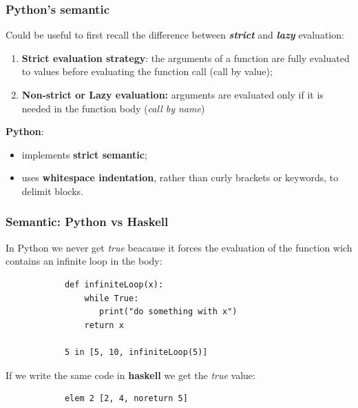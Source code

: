 \documentclass[xcolor ={table,usenames,dvipsnames}]{beamer}
\theoremstyle{definition}
\begin{document}
	\begin{frame}
		\frametitle{Python's semantic}
			Could be useful to first recall the difference between \textit{\textbf{strict}} and \textit{\textbf{lazy}} evaluation:
			\begin{enumerate}
				\item \textbf{Strict evaluation strategy}: the arguments of a function are fully evaluated to values before evaluating the function call (call by value);
				\item \textbf{Non-strict or Lazy evaluation:} arguments are evaluated only if it is needed in the function body (\textit{call by name})
			\end{enumerate}
			\textbf{Python}:		
			\begin{itemize}
				\item implements \textbf{strict semantic};
				\item uses \textbf{whitespace indentation}, rather than curly brackets or keywords, to delimit blocks.
			\end{itemize}
	\end{frame}

	\begin{frame}[fragile]
		\frametitle{Semantic: Python vs Haskell}
		In Python we never get \textit{true} beacause  it forces the evaluation of the function wich contains an infinite loop in the body:
		\begin{lstlisting}
			def infiniteLoop(x):
			    while True:
		           print("do something with x")
		        return x
				
			5 in [5, 10, infiniteLoop(5)]
		\end{lstlisting}
		If we write the same code in \textbf{haskell} we get the \textit{true} value:
		\begin{lstlisting}
			elem 2 [2, 4, noreturn 5]
		\end{lstlisting}
	\end{frame}

		
\end{document}
